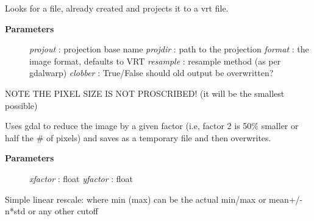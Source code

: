 \documentclass[letterpaper,10pt,english]{sphinxmanual}
\begin{document}
\begin{fulllineitems}
\begin{fulllineitems}
\begin{description}
\end{description}

\end{fulllineitems}


\begin{fulllineitems}
\label{code:Image.Image.projectImg}
Looks for a file, already created and projects it to a vrt file.
\begin{description}
\item[{\textbf{Parameters}}] \leavevmode
\emph{projout}   : projection base name
\emph{projdir}   : path to the projection
\emph{format}    : the image format, defaults to VRT
\emph{resample}  : resample method (as per gdalwarp)
\emph{clobber}   : True/False should old output be overwritten?

\end{description}

NOTE THE PIXEL SIZE IS NOT PROSCRIBED! (it will be the smallest possible)

\end{fulllineitems}


\begin{fulllineitems}
\label{code:Image.Image.reduceImg}
Uses gdal to reduce the image by a given factor (i.e, factor 2 is 50\%
smaller or half the \# of pixels) and saves as a temporary file and then overwrites.
\begin{description}
\item[{\textbf{Parameters}}] \leavevmode
\emph{xfactor}   : float
\emph{yfactor}   : float

\end{description}

\end{fulllineitems}


\begin{fulllineitems}
\label{code:Image.Image.stretchLinear}
Simple linear rescale: where min (max) can be the actual min/max or mean+/- n*std or any other cutoff


\end{fulllineitems}
\end{fulllineitems}
\end{document}
